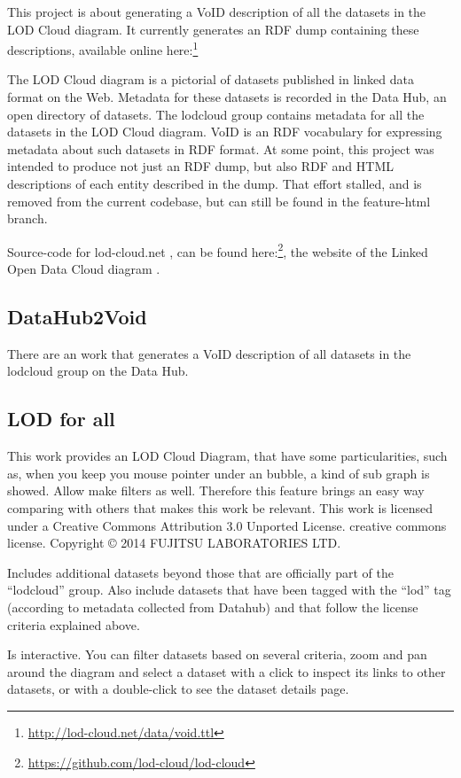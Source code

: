 This project is about generating a VoID description of all the datasets in the LOD Cloud diagram. It currently generates an RDF dump containing these descriptions, available online here:\footnote{\url{http://lod-cloud.net/data/void.ttl}}

The LOD Cloud diagram is a pictorial of datasets published in linked data format on the Web.
Metadata for these datasets is recorded in the Data Hub, an open directory of datasets. The lodcloud group contains metadata for all the datasets in the LOD Cloud diagram.
VoID is an RDF vocabulary for expressing metadata about such datasets in RDF format.
At some point, this project was intended to produce not just an RDF dump, but also RDF and HTML descriptions of each entity described in the dump. That effort stalled, and is removed from the current codebase, but can still be found in the feature-html branch.

Source-code for lod-cloud.net \cite{lodcloud}, can be found here:\footnote{ \url{https://github.com/lod-cloud/lod-cloud}}, the website of the Linked Open Data Cloud diagram \cite{lodcloud}.

\subsection{DataHub2Void}
There are an work \cite{Datahub2Void} that generates a VoID description of all datasets in the lodcloud group on the Data Hub.

\subsection{LOD for all}
This work \cite{lod4all} provides an LOD Cloud Diagram, that have some particularities, such as, when you keep you mouse pointer under an bubble, a kind of sub graph is showed. Allow make filters as well. Therefore this feature brings an easy way comparing with others that makes this work be relevant.
This work is licensed under a Creative Commons Attribution 3.0 Unported License. creative commons license. Copyright © 2014 FUJITSU LABORATORIES LTD.

Includes additional datasets beyond those that are officially part of the “lodcloud” group. Also include datasets that have been tagged with the “lod” tag (according to metadata collected from Datahub) and that follow the license criteria explained above.

Is interactive. You can filter datasets based on several criteria, zoom and pan around the diagram and select a dataset with a click to inspect its links to other datasets, or with a double-click to see the dataset details page.

